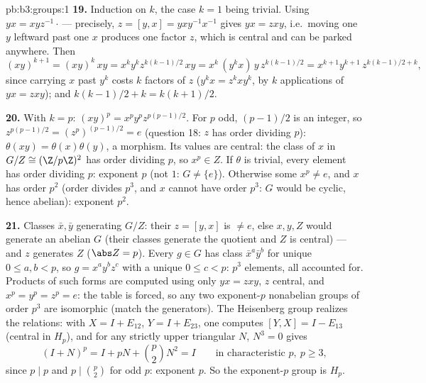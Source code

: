\begin{solution}{pb:b3:groups:1}
\textbf{19.} Induction on $k$, the case $k = 1$ being trivial.
Using $yx = xyz^{-1}\cdot$\,--- precisely, $z = [y, x] =
yxy^{-1}x^{-1}$ gives $yx = zxy$, i.e.\ moving one $y$ leftward
past one $x$ produces one factor $z$, which is central and can
be parked anywhere. Then
\[
(xy)^{k+1} = (xy)^k\,xy = x^ky^kz^{k(k-1)/2}\,xy
= x^k\,(y^kx)\,y\,z^{k(k-1)/2}
= x^{k+1}y^{k+1}\,z^{k(k-1)/2 + k},
\]
since carrying $x$ past $y^k$ costs $k$ factors of $z$ ($y^kx =
z^kxy^k$, by $k$ applications of $yx = zxy$); and $k(k-1)/2 + k
= k(k+1)/2$.

\textbf{20.} With $k = p$: $(xy)^p = x^py^pz^{p(p-1)/2}$. For
$p$ odd, $(p-1)/2$ is an integer, so $z^{p(p-1)/2} =
(z^p)^{(p-1)/2} = e$ (question 18: $z$ has order dividing $p$):
$\theta(xy) = \theta(x)\theta(y)$, a morphism. Its values are
central: the class of $x$ in $G/Z \cong (\Z/p\Z)^2$ has order
dividing $p$, so $x^p \in Z$. If $\theta$ is trivial, every
element has order dividing $p$: exponent $p$ (not $1$: $G \neq
\{e\}$). Otherwise some $x^p \neq e$, and $x$ has order $p^2$
(order divides $p^3$, and $x$ cannot have order $p^3$: $G$
would be cyclic, hence abelian): exponent $p^2$.

\textbf{21.} Classes $\bar x, \bar y$ generating $G/Z$: their
 $z = [y, x]$ is $\neq e$, else $x, y, Z$ would
generate an abelian $G$ (their classes generate the quotient and
$Z$ is central) --- and $z$ generates $Z$ ($\abs Z = p$). Every
$g \in G$ has class $\bar x^a\bar y^b$ for unique $0 \leq a, b <
p$, so $g = x^ay^bz^c$ with a unique $0 \leq c < p$: $p^3$
elements, all accounted for. Products of such  forms are
computed using only $yx = zxy$, $z$ central, and $x^p = y^p =
z^p = e$: the table is forced, so any two exponent-$p$
nonabelian groups of order $p^3$ are isomorphic (match the
generators). The Heisenberg group realizes the relations: with
$X = I + E_{12}$, $Y = I + E_{23}$, one computes $[Y, X] = I -
E_{13}$ (central in $H_p$), and for any strictly upper
triangular $N$, $N^3 = 0$ gives
\[
(I + N)^p = I + pN + \binom p2N^2 = I
\qquad\text{in characteristic } p,\ p \geq 3,
\]
since $p \mid p$ and $p \mid \binom p2$ for odd $p$: exponent
$p$. So the exponent-$p$ group is $H_p$.


\end{solution}
